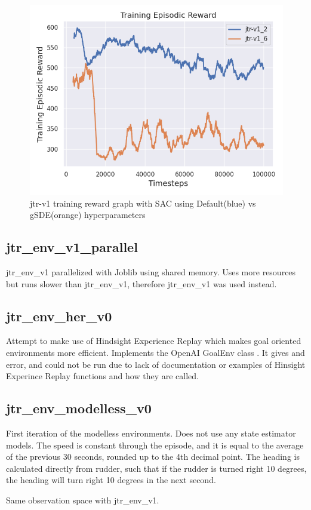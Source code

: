 \begin{figure}[h]
\centering
\includegraphics[width = 0.6\hsize]{figures/rl-reward-plots/jtr-v1 100k.png}
\caption{jtr-v1 training reward graph with SAC using Default(blue) vs gSDE(orange) hyperparameters}
\label{fig:jtr-v1-training}
\end{figure}

\subsection*{jtr\_env\_v1\_parallel}
jtr\_env\_v1 parallelized with Joblib using shared memory. Uses more resources but runs slower than jtr\_env\_v1, therefore jtr\_env\_v1 was used instead.

\subsection*{jtr\_env\_her\_v0}
Attempt to make use of Hindsight Experience Replay \cite{her-paper} which makes goal oriented environments more efficient. Implements the OpenAI GoalEnv class \cite{openai-gym}. It gives and error, and could not be run due to lack of documentation or examples of Hinsight Experince Replay functions and how they are called.

\subsection*{jtr\_env\_modelless\_v0}
First iteration of the modelless environments. Does not use any state estimator models. The speed is constant through the episode, and it is equal to the average of the previous 30 seconds, rounded up to the 4th decimal point. The heading is calculated directly from rudder, such that if the rudder is turned right 10 degrees, the heading will turn right 10 degrees in the next second.

Same observation space with jtr\_env\_v1.

